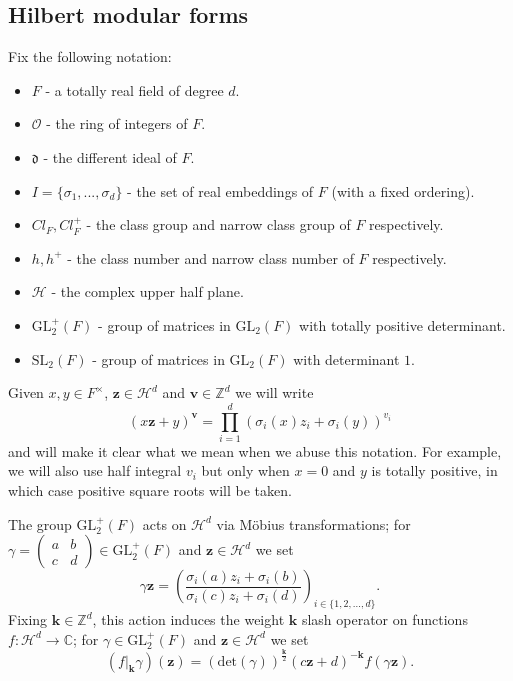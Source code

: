 \documentclass[a4paper,oneside]{amsart}
\theoremstyle{plain}
\theoremstyle{definition}
\begin{document}
\subsection{Hilbert modular forms}
Fix the following notation:
\begin{itemize}
\item{$F$ - a totally real field of degree $d$.}
\item{$\mathcal{O}$ - the ring of integers of $F$.}
\item{$\mathfrak{d}$ - the different ideal of $F$.}
\item{$I = \{\sigma_1,...,\sigma_d\}$ - the set of real embeddings of $F$ (with a fixed ordering).}
\item{$Cl_F, Cl_{F}^{+}$ - the class group and narrow class group of $F$ respectively.}
\item{$h, h^{+}$ - the class number and narrow class number of $F$ respectively.}
\item{$\mathcal{H}$ - the complex upper half plane.}
\item{$\text{GL}^{+}_2(F)$ - group of matrices in $\text{GL}_2(F)$ with totally positive determinant.}
\item{$\text{SL}_2(F)$ - group of matrices in $\text{GL}_2(F)$ with determinant $1$.}
\end{itemize}

Given $x,y\in F^{\times}$, $\textbf{z}\in\mathcal{H}^d$ and $\textbf{v}\in\mathbb{Z}^d$ we will write \[(x\textbf{z}+y)^{\textbf{v}} = \prod_{i=1}^d(\sigma_i(x)z_i+\sigma_i(y))^{v_i}\] and will make it clear what we mean when we abuse this notation. For example, we will also use half integral $v_i$ but only when $x=0$ and $y$ is totally positive, in which case positive square roots will be taken.

The group $\text{GL}^{+}_2(F)$ acts on $\mathcal{H}^d$ via M\"obius transformations; for $\gamma = \left(\begin{array}{cc}a & b\\ c & d\end{array}\right)\in \text{GL}^{+}_2(F)$ and $\textbf{z}\in\mathcal{H}^d$ we set \[\gamma\textbf{z} = \left(\frac{\sigma_i(a) z_i + \sigma_i(b)}{\sigma_i(c) z_i + \sigma_i(d)}\right)_{i\in\{1,2,...,d\}}.\] Fixing $\textbf{k}\in\mathbb{Z}^d$, this action induces the weight $\textbf{k}$ slash operator on functions $f:\mathcal{H}^d \rightarrow \mathbb{C}$; for $\gamma\in\text{GL}^{+}_2(F)$ and $\textbf{z}\in\mathcal{H}^d$ we set \[(f|_\textbf{k}\gamma)(\textbf{z}) = (\text{det}(\gamma))^{\frac{\textbf{k}}{2}}(c\textbf{z}+d)^{-\textbf{k}}f(\gamma\textbf{z}).\]
\end{document}
